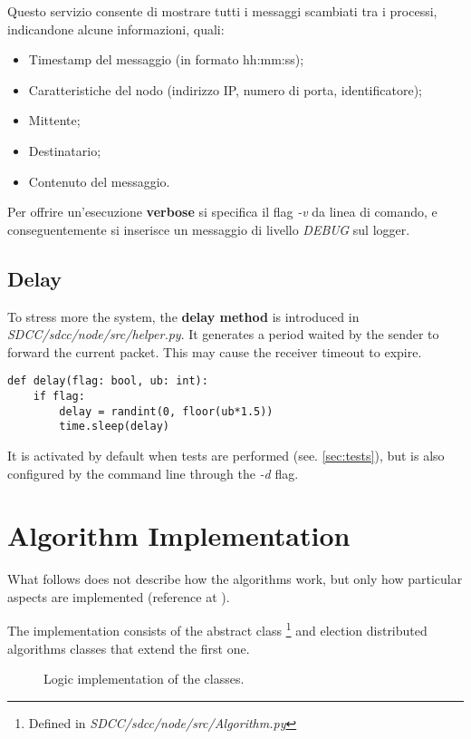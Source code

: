 \documentclass[conference]{IEEEtran}
\begin{document}
Questo servizio consente di mostrare tutti i messaggi scambiati tra i processi, indicandone alcune informazioni, quali:
\begin{itemize}
	\item Timestamp del messaggio (in formato hh:mm:ss);
	\item Caratteristiche del nodo (indirizzo IP, numero di porta, identificatore);
	\item Mittente;
	\item Destinatario;
	\item Contenuto del messaggio.
\end{itemize}
Per offrire un'esecuzione \textbf{verbose} si specifica il flag \textit{-v} da linea di comando, e conseguentemente si inserisce un messaggio di livello \textit{DEBUG} sul logger.


\subsection{Delay}\label{delay}


To stress more the system, the \textbf{delay method} is introduced in \textit{SDCC/sdcc/node/src/helper.py}. It generates a period waited by the sender to forward the current packet. This may cause the receiver timeout to expire.
\begin{lstlisting}
def delay(flag: bool, ub: int):
    if flag:
        delay = randint(0, floor(ub*1.5))
        time.sleep(delay)
\end{lstlisting}
It is activated by default when tests are performed (see. \ref{sec:tests}), but is also configured by the command line through the \textit{-d} flag.

\section{Algorithm Implementation}

What follows does not describe how the algorithms work, but only how particular aspects are implemented (reference at \cite{coulouris2005distributed}).

The implementation consists of the abstract class \footnote{Defined in \textit{SDCC/sdcc/node/src/Algorithm.py}} and election distributed algorithms classes that extend the first one. 

\begin{figure}[htbp]
  \centering
  
  \caption{Logic implementation of the classes.}
\end{figure}
\end{document}
